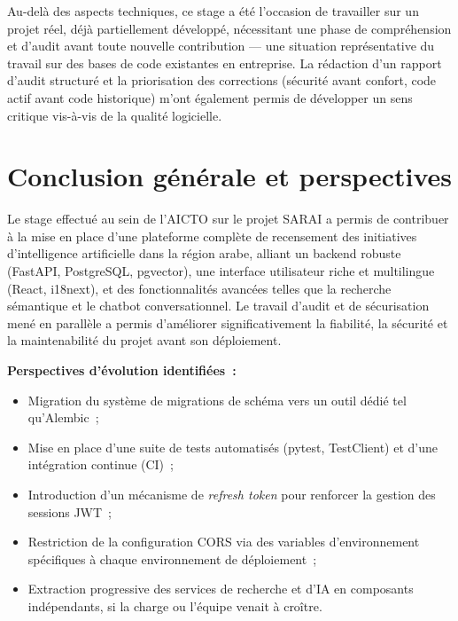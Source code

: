 \documentclass[11pt,a4paper]{report}
\begin{document}
Au-delà des aspects techniques, ce stage a été l'occasion de travailler sur un projet réel, déjà
partiellement développé, nécessitant une phase de compréhension et d'audit avant toute nouvelle
contribution — une situation représentative du travail sur des bases de code existantes en entreprise. La
rédaction d'un rapport d'audit structuré et la priorisation des corrections (sécurité avant confort, code
actif avant code historique) m'ont également permis de développer un sens critique vis-à-vis de la qualité
logicielle.

\chapter{Conclusion générale et perspectives}

Le stage effectué au sein de l'AICTO sur le projet SARAI a permis de contribuer à la mise en place d'une
plateforme complète de recensement des initiatives d'intelligence artificielle dans la région arabe,
alliant un backend robuste (FastAPI, PostgreSQL, pgvector), une interface utilisateur riche et multilingue
(React, i18next), et des fonctionnalités avancées telles que la recherche sémantique et le chatbot
conversationnel. Le travail d'audit et de sécurisation mené en parallèle a permis d'améliorer
significativement la fiabilité, la sécurité et la maintenabilité du projet avant son déploiement.

\textbf{Perspectives d'évolution identifiées~:}

\begin{itemize}
  \item Migration du système de migrations de schéma vers un outil dédié tel qu'Alembic~;
  \item Mise en place d'une suite de tests automatisés (pytest, TestClient) et d'une intégration continue
    (CI)~;
  \item Introduction d'un mécanisme de \emph{refresh token} pour renforcer la gestion des sessions JWT~;
  \item Restriction de la configuration CORS via des variables d'environnement spécifiques à chaque
    environnement de déploiement~;
  \item Extraction progressive des services de recherche et d'IA en composants indépendants, si la charge ou
    l'équipe venait à croître.
\end{itemize}
\end{document}
